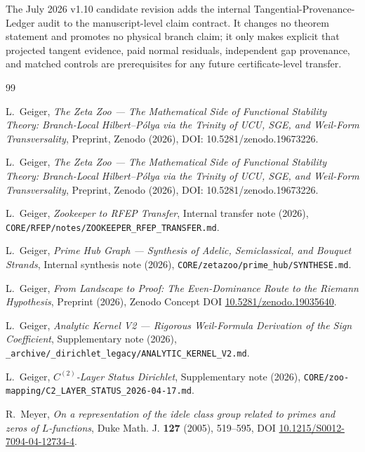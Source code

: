 \documentclass[11pt,a4paper]{article}
\theoremstyle{plain}
\theoremstyle{definition}
\begin{document}
The July 2026 v1.10 candidate revision adds the internal
Tangential-Provenance-Ledger audit to the manuscript-level claim
contract.  It changes no theorem statement and promotes no physical
branch claim; it only makes explicit that projected tangent evidence,
paid normal residuals, independent gap provenance, and matched
controls are prerequisites for any future certificate-level transfer.

\begingroup
\sloppy

\endgroup

\begin{thebibliography}{99}

L.~Geiger,
\textit{The Zeta Zoo --- The Mathematical Side of Functional
Stability Theory: Branch-Local Hilbert--P\'olya via the Trinity of
UCU, SGE, and Weil-Form Transversality},
Preprint, Zenodo (2026), DOI: 10.5281/zenodo.19673226.

L.~Geiger,
\textit{The Zeta Zoo --- The Mathematical Side of Functional
Stability Theory: Branch-Local Hilbert--P\'olya via the Trinity of
UCU, SGE, and Weil-Form Transversality},
Preprint, Zenodo (2026), DOI: 10.5281/zenodo.19673226.


L.~Geiger,
\textit{Zookeeper to RFEP Transfer},
Internal transfer note (2026),
  \texttt{CORE/RFEP/notes/ZOOKEEPER\_RFEP\_TRANSFER.md}.

L.~Geiger,
\textit{Prime Hub Graph --- Synthesis of Adelic, Semiclassical,
and Bouquet Strands},
Internal synthesis note (2026),
\texttt{CORE/zetazoo/prime\_hub/SYNTHESE.md}.

L.~Geiger,
\textit{From Landscape to Proof: The Even-Dominance Route to the
Riemann Hypothesis},
Preprint (2026),
Zenodo Concept DOI \href{https://doi.org/10.5281/zenodo.19035640}{10.5281/zenodo.19035640}.

L.~Geiger,
\textit{Analytic Kernel V2 --- Rigorous Weil-Formula Derivation
of the Sign Coefficient},
Supplementary note (2026),
\texttt{\_archive/\_dirichlet\_legacy/ANALYTIC\_KERNEL\_V2.md}.

L.~Geiger,
\textit{$C^{(2)}$-Layer Status Dirichlet},
Supplementary note (2026),
\texttt{CORE/zoo-mapping/C2\_LAYER\_STATUS\_2026-04-17.md}.

R.~Meyer,
\textit{On a representation of the idele class group related to
primes and zeros of $L$-functions},
Duke Math. J. \textbf{127} (2005), 519--595,
DOI \href{https://doi.org/10.1215/S0012-7094-04-12734-4}{10.1215/S0012-7094-04-12734-4}.


\end{thebibliography}
\end{document}
